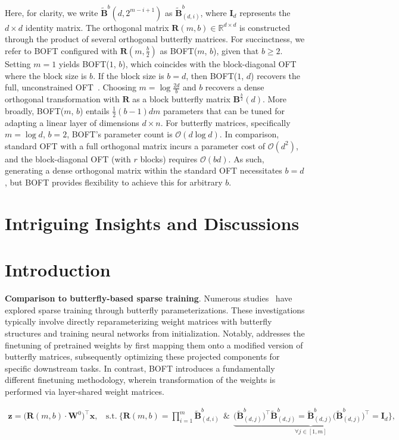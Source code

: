 Here, for clarity, we write $\tilde{\bm{B}}^b(d, 2^{m - i + 1})$ as $\tilde{\bm{B}}^b_{(d, i)}$, where $\bm{I}_d$ represents the $d \times d$ identity matrix. The orthogonal matrix $\bm{R}(m, b)\in\mathbb{R}^{d\times d}$ is constructed through the product of several orthogonal butterfly matrices. For succinctness, we refer to BOFT configured with $\bm{R}(m, \frac{b}{2})$ as BOFT($m$, $b$), given that $b \geq 2$. Setting $m = 1$ yields BOFT($1$, $b$), which coincides with the block-diagonal OFT~\cite{qiu2023controlling} where the block size is $b$. If the block size is $b = d$, then BOFT($1$, $d$) recovers the full, unconstrained OFT~\cite{qiu2023controlling}. Choosing $m = \log \frac{2d}{b}$ and $b$ recovers a dense orthogonal transformation with $\bm{R}$ as a block butterfly matrix $\bm{B}^{\frac{b}{2}}(d)$. More broadly, BOFT($m$, $b$) entails $\frac{1}{2}(b-1)dm$ parameters that can be tuned for adapting a linear layer of dimensions $d \times n$. For butterfly matrices, specifically $m = \log d$, $b = 2$, BOFT’s parameter count is $\mathcal{O}(d\log d)$. In comparison, standard OFT with a full orthogonal matrix incurs a parameter cost of $\mathcal{O}(d^2)$, and the block-diagonal OFT (with $r$ blocks) requires $\mathcal{O}(bd)$. As such, generating a dense orthogonal matrix within the standard OFT necessitates $b = d$, but BOFT provides flexibility to achieve this for arbitrary $b$.

\section{Intriguing Insights and Discussions}

\section{Introduction}

\textbf{Comparison to butterfly-based sparse training}. Numerous studies~\cite{dao2019learning,dao2019kaleidoscope,chen2022pixelated,dao2022monarch} have explored sparse training through butterfly parameterizations. These investigations typically involve directly reparameterizing weight matrices with butterfly structures and training neural networks from initialization. Notably, \cite{dao2022monarch} addresses the finetuning of pretrained weights by first mapping them onto a modified version of butterfly matrices, subsequently optimizing these projected components for specific downstream tasks. In contrast, BOFT introduces a fundamentally different finetuning methodology, wherein transformation of the weights is performed via layer-shared weight matrices.

\begin{equation}
    \begin{aligned}\nonumber
    \bm{z} = \big(\bm{R}(m, b) \cdot \bm{W}^0\big)^\top \bm{x},~~~~\text{s.t.}~\bigg\{ \bm{R}(m, b) = \prod_{i=1}^m \tilde{\bm{B}}^b_{(d, i)}~~\&~~\underbrace{\big(\tilde{\bm{B}}^b_{(d, j)}\big)^\top\tilde{\bm{B}}^b_{(d, j)} = \tilde{\bm{B}}^b_{(d, j)}\big(\tilde{\bm{B}}^b_{(d, j)}\big)^\top = \bm{I}_d}_{\forall j\in [1, m]}\bigg\},
    \end{aligned}
\end{equation}